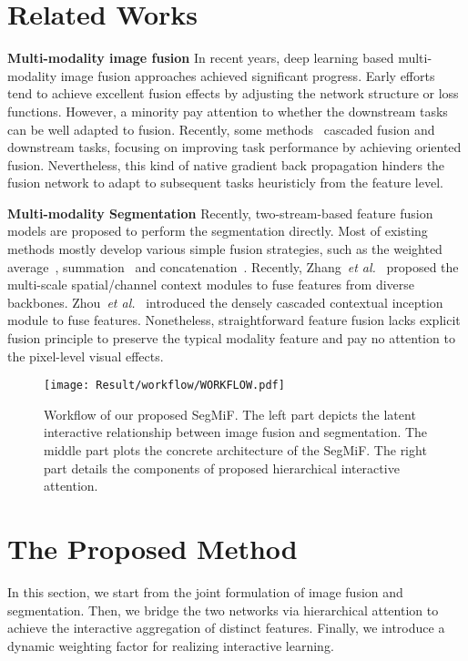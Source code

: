 \documentclass[10pt,twocolumn,letterpaper]{article}
\begin{document}
\section{Related Works}


\noindent\textbf{Multi-modality image fusion} 
In recent years, deep learning based multi-modality image fusion approaches achieved significant progress\cite{reconet,UMFusion,zhang2023ingredient,huang2023learning,liu2023holoco}. Early efforts~\cite{MFEIF2021,U2Fusion2020,zhao2020didfuse,liu2023bilevel,liu2021searching} tend to achieve excellent fusion effects by adjusting the network structure or loss functions. However, a minority pay attention to whether the downstream tasks can be well adapted to fusion. Recently, some methods~\cite{wang2023interactively,TarDAL,li2023lrrnet} cascaded fusion and downstream tasks, focusing on improving task performance by achieving oriented fusion. Nevertheless, this kind of native gradient back propagation hinders the fusion network to adapt to subsequent tasks heuristicly from the feature level.

\noindent\textbf{Multi-modality Segmentation}
Recently, two-stream-based  feature fusion models are proposed to perform the segmentation directly.  Most of existing methods mostly develop various simple fusion strategies, such as the weighted average~\cite{guan2019fusion,zhang2020revisiting,liu2023task}, summation~\cite{sun2019rtfnet,zhou2022effective} and concatenation~\cite{ha2017mfnet,shivakumar2020pst900}. Recently, Zhang~\emph{et al.}~\cite{abmdrnet} proposed the multi-scale spatial/channel context modules to fuse features from diverse backbones. Zhou~\emph{et al.}~\cite{zhou2021edge} introduced the densely cascaded contextual inception module to fuse features. Nonetheless, straightforward feature fusion lacks explicit 
fusion principle to preserve the typical modality feature and pay no attention to the pixel-level visual effects.
\begin{figure*}[!htb]
	\centering
	\setlength{\tabcolsep}{1pt} 
	
	\texttt{[image: Result/workflow/WORKFLOW.pdf]}
	\caption{Workflow of our proposed SegMiF. The left part depicts the latent interactive relationship between image fusion and segmentation. The middle part plots the concrete architecture of the SegMiF. The right part  details the components of proposed hierarchical interactive attention. }
\label{fig:workflow}
\end{figure*}

\section{The Proposed Method}
In this section, we start from the joint formulation of image fusion and segmentation. Then, we bridge the two networks via hierarchical  attention to achieve the interactive aggregation of distinct features. Finally, we introduce a dynamic weighting factor for realizing interactive learning. 
\end{document}
